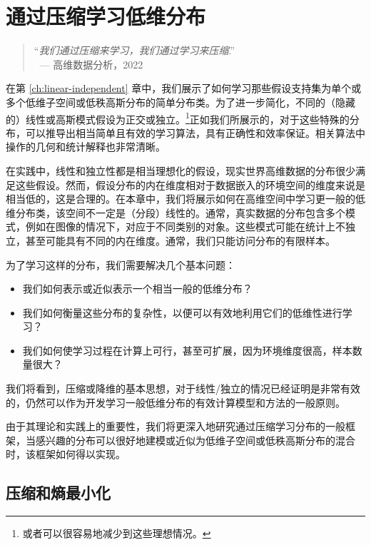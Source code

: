 \documentclass[../../book-main.tex]{subfiles}
\begin{document}
\chapter{通过压缩学习低维分布}
\label{ch:compression}\label{ch:general-distribution}

\begin{quote}
\hfill    ``{\em 我们通过压缩来学习，我们通过学习来压缩}.''\\
$~$ \hfill --- 高维数据分析，2022   
\end{quote}
\vspace{5mm}

在第 \ref{ch:linear-independent} 章中，我们展示了如何学习那些假设支持集为单个或多个低维子空间或低秩高斯分布的简单分布类。为了进一步简化，不同的（隐藏的）线性或高斯模式假设为正交或独立。\footnote{或者可以很容易地减少到这些理想情况。}正如我们所展示的，对于这些特殊的分布，可以推导出相当简单且有效的学习算法，具有正确性和效率保证。相关算法中操作的几何和统计解释也非常清晰。

在实践中，线性和独立性都是相当理想化的假设，现实世界高维数据的分布很少满足这些假设。然而，假设分布的内在维度相对于数据嵌入的环境空间的维度来说是相当低的，这是合理的。在本章中，我们将展示如何在高维空间中学习更一般的低维分布类，该空间不一定是（分段）线性的。通常，真实数据的分布包含多个模式，例如在图像的情况下，对应于不同类别的对象。这些模式可能在统计上不独立，甚至可能具有不同的内在维度。通常，我们只能访问分布的有限样本。

为了学习这样的分布，我们需要解决几个基本问题：
\begin{itemize}
    \item 我们如何表示或近似表示一个相当一般的低维分布？
    \item 我们如何衡量这些分布的复杂性，以便可以有效地利用它们的低维性进行学习？
    \item 我们如何使学习过程在计算上可行，甚至可扩展，因为环境维度很高，样本数量很大？
\end{itemize} 我们将看到，压缩或降维的基本思想，对于线性/独立的情况已经证明是非常有效的，仍然可以作为开发学习一般低维分布的有效计算模型和方法的一般原则。

由于其理论和实践上的重要性，我们将更深入地研究通过压缩学习分布的一般框架，当感兴趣的分布可以很好地建模或近似为低维子空间或低秩高斯分布的混合时，该框架如何得以实现。

\section{压缩和熵最小化}
\end{document}
